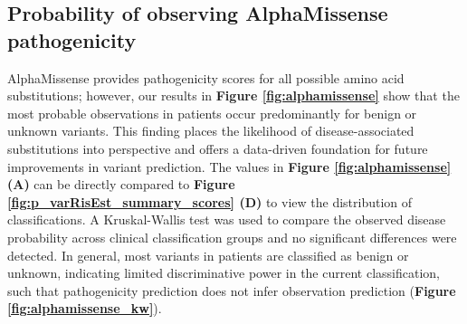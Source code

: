 \subsection{Probability of observing AlphaMissense pathogenicity}
AlphaMissense provides pathogenicity scores for all possible amino acid substitutions; however, our results in \textbf{Figure \ref{fig:alphamissense}} show that the most probable observations in patients occur predominantly for benign or unknown variants. This finding places the likelihood of disease-associated substitutions into perspective and offers a data-driven foundation for future improvements in variant prediction. The values in 
\textbf{Figure \ref{fig:alphamissense} (A)} can be directly compared to 
\textbf{Figure \ref{fig:p_varRisEst_summary_scores} (D)} to view the distribution of classifications.
A Kruskal-Wallis test was used to compare the observed disease probability across clinical classification groups and no significant differences were detected. In general, most variants in patients are classified as benign or unknown, indicating limited discriminative power in the current classification, such that pathogenicity prediction does not infer observation prediction (\textbf{Figure \ref{fig:alphamissense_kw}}).
  
